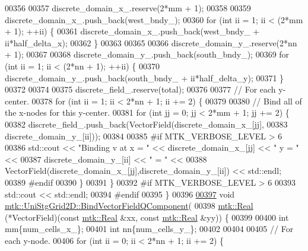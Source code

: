 \begin{DoxyCode}
00356 
00357   discrete\_domain\_x\_.reserve(2*mm + 1);
00358 
00359   discrete\_domain\_x\_.push\_back(west\_bndy\_);
00360   \textcolor{keywordflow}{for} (\textcolor{keywordtype}{int} ii = 1; ii < (2*mm + 1); ++ii) \{
00361     discrete\_domain\_x\_.push\_back(west\_bndy\_ + ii*half\_delta\_x);
00362   \}
00363 
00365 
00366   discrete\_domain\_y\_.reserve(2*nn + 1);
00367 
00368   discrete\_domain\_y\_.push\_back(south\_bndy\_);
00369   \textcolor{keywordflow}{for} (\textcolor{keywordtype}{int} ii = 1; ii < (2*nn + 1); ++ii) \{
00370     discrete\_domain\_y\_.push\_back(south\_bndy\_ + ii*half\_delta\_y);
00371   \}
00372 
00374 
00375   discrete\_field\_.reserve(total);
00376 
00377   \textcolor{comment}{// For each y-center.}
00378   \textcolor{keywordflow}{for} (\textcolor{keywordtype}{int} ii = 1; ii < 2*nn + 1; ii += 2) \{
00379 
00380     \textcolor{comment}{// Bind all of the x-nodes for this y-center.}
00381     \textcolor{keywordflow}{for} (\textcolor{keywordtype}{int} jj = 0; jj < 2*mm + 1; jj += 2) \{
00382       discrete\_field\_.push\_back(VectorField(discrete\_domain\_x\_[jj],
00383                                             discrete\_domain\_y\_[ii]));
00384 
00385 \textcolor{preprocessor}{      #if MTK\_VERBOSE\_LEVEL > 6}
00386       std::cout << \textcolor{stringliteral}{"Binding v at x = "} << discrete\_domain\_x\_[jj] << \textcolor{stringliteral}{" y = "} <<
00387         discrete\_domain\_y\_[ii] << \textcolor{stringliteral}{" = "} <<
00388         VectorField(discrete\_domain\_x\_[jj],discrete\_domain\_y\_[ii]) << std::endl;
00389 \textcolor{preprocessor}{      #endif}
00390     \}
00391   \}
00392 \textcolor{preprocessor}{  #if MTK\_VERBOSE\_LEVEL > 6}
00393   std::cout << std::endl;
00394 \textcolor{preprocessor}{  #endif}
00395 \}
00396 
\hypertarget{mtk__uni__stg__grid__2d_8cc_source_l00397}{}\hyperlink{classmtk_1_1UniStgGrid2D_a9643167e149da2ea4e57fd12cb9f1a97}{00397} \textcolor{keywordtype}{void} \hyperlink{classmtk_1_1UniStgGrid2D_a9643167e149da2ea4e57fd12cb9f1a97}{mtk::UniStgGrid2D::BindVectorFieldQComponent}(
00398   \hyperlink{group__c01-roots_gac080bbbf5cbb5502c9f00405f894857d}{mtk::Real} (*VectorField)(\textcolor{keyword}{const} \hyperlink{group__c01-roots_gac080bbbf5cbb5502c9f00405f894857d}{mtk::Real} &xx, \textcolor{keyword}{const} 
      \hyperlink{group__c01-roots_gac080bbbf5cbb5502c9f00405f894857d}{mtk::Real} &yy)) \{
00399 
00400   \textcolor{keywordtype}{int} mm\{num\_cells\_x\_\};
00401   \textcolor{keywordtype}{int} nn\{num\_cells\_y\_\};
00402 
00404 
00405   \textcolor{comment}{// For each y-node.}
00406   \textcolor{keywordflow}{for} (\textcolor{keywordtype}{int} ii = 0; ii < 2*nn + 1; ii += 2) \{

\end{DoxyCode}

